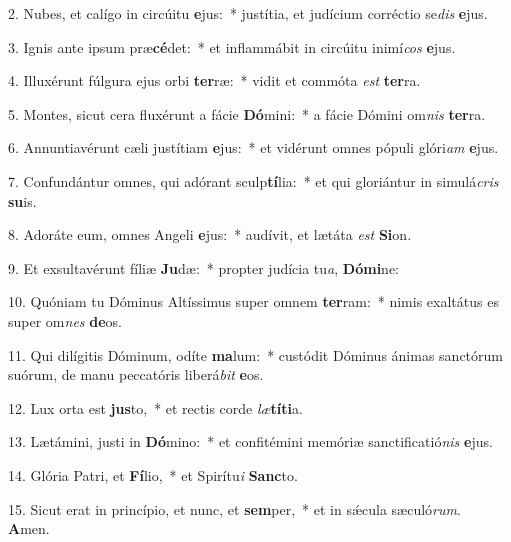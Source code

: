 2. Nubes, et calígo in circúitu \textbf{e}jus:~*  justítia, et judícium corréctio se\textit{dis} \textbf{e}jus.\

3. Ignis ante ipsum præ\textbf{cé}det:~*  et inflammábit in circúitu inimí\textit{cos} \textbf{e}jus.\

4. Illuxérunt fúlgura ejus orbi \textbf{ter}ræ:~*  vidit et commóta \textit{est} \textbf{ter}ra.\

5. Montes, sicut cera fluxérunt a fácie \textbf{Dó}mini:~*  a fácie Dómini om\textit{nis} \textbf{ter}ra.\

6. Annuntiavérunt cæli justítiam \textbf{e}jus:~*  et vidérunt omnes pópuli glóri\textit{am} \textbf{e}jus.\

7. Confundántur omnes, qui adórant sculp\textbf{tí}lia:~*  et qui gloriántur in simulá\textit{cris} \textbf{su}is.\

8. Adoráte eum, omnes Angeli \textbf{e}jus:~*  audívit, et lætáta \textit{est} \textbf{Si}on.\

9. Et exsultavérunt fíliæ \textbf{Ju}dæ:~*  propter judícia tu\textit{a}, \textbf{Dó}\textbf{mi}ne:\

10. Quóniam tu Dóminus Altíssimus super omnem \textbf{ter}ram:~*  nimis exaltátus es super om\textit{nes} \textbf{de}os.\

11. Qui dilígitis Dóminum, odíte \textbf{ma}lum:~*  custódit Dóminus ánimas sanctórum suórum, de manu peccatóris liberá\textit{bit} \textbf{e}os.\

12. Lux orta est \textbf{jus}to,~*  et rectis corde \textit{læ}\textbf{tí}\textbf{ti}a.\

13. Lætámini, justi in \textbf{Dó}mino:~*  et confitémini memóriæ sanctificatió\textit{nis} \textbf{e}jus.\

14. Glória Patri, et \textbf{Fí}lio,~*  et Spirítu\textit{i} \textbf{Sanc}to.\

15. Sicut erat in princípio, et nunc, et \textbf{sem}per,~*  et in sǽcula sæculó\textit{rum}. \textbf{A}men.\

